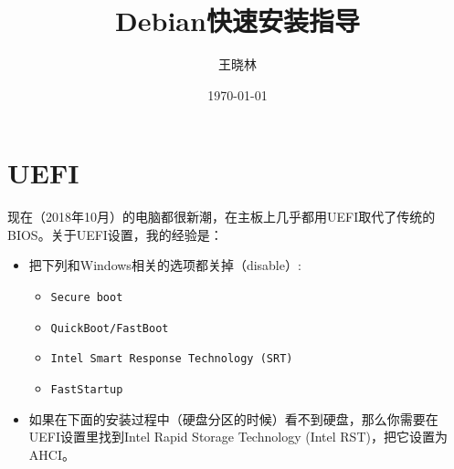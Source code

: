\documentclass{wx672ctexart}
\author{王晓林}
\date{\today}
\title{Debian快速安装指导}
\begin{document}
\maketitle
\tableofcontents


\section{UEFI}
\label{sec:org902f24c}
现在（2018年10月）的电脑都很新潮，在主板上几乎都用UEFI取代了传统的BIOS。关于UEFI设置，我的经验是：
\begin{itemize}
\item 把下列和Windows相关的选项都关掉（disable）:
\begin{itemize}
\item \texttt{Secure boot}
\item \texttt{QuickBoot/FastBoot}
\item \texttt{Intel Smart Response Technology (SRT)}
\item \texttt{FastStartup}
\end{itemize}
\item 如果在下面的安装过程中（硬盘分区的时候）看不到硬盘，那么你需要在UEFI设置里找到Intel Rapid Storage
Technology (Intel RST)，把它设置为AHCI。
\end{itemize}
\end{document}
